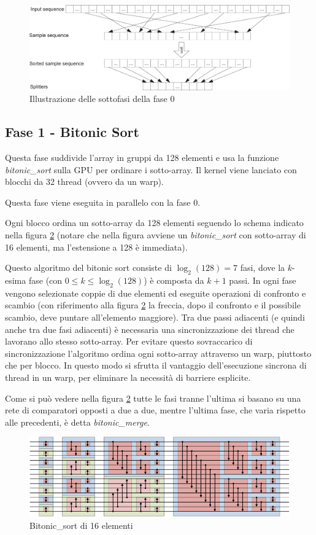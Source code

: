 \documentclass[a4paper, 11pt]{article}
\begin{document}
			\begin{figure}
				\centering
				\includegraphics[width=0.9\linewidth]{img/fase0}
				\caption{Illustrazione delle sottofasi della fase 0}
				\label{fig:fase0}
			\end{figure}
			
		\subsection{Fase 1 - Bitonic Sort}
			\label{fase1}
			Questa fase suddivide l'array in gruppi da 128 elementi e usa la funzione \emph{bitonic\_sort} sulla GPU per
			ordinare i sotto-array.
			Il kernel viene lanciato con blocchi da 32 thread (ovvero da un warp).
			
			Questa fase viene eseguita in parallelo con la fase 0.
			
			Ogni blocco ordina un sotto-array da 128 elementi seguendo lo schema indicato nella figura 
			\ref{fig:bitonicsort}
			(notare che nella figura avviene un \emph{bitonic\_sort} con sotto-array di 16 elementi, ma l'estensione a 128 è immediata).
			
			Questo algoritmo del bitonic sort consiste di $\log_2(128) = 7$ fasi, dove la $k$-esima fase (con $0 \leq k \leq \log_2(128)$) è 
			composta da $k+1$ passi.
			In ogni fase vengono selezionate coppie di due elementi ed eseguite operazioni di confronto e scambio (con riferimento alla figura
			\ref{fig:bitonicsort} la freccia, dopo il confronto e il possibile scambio, deve puntare all'elemento maggiore). 
			Tra due passi adiacenti (e quindi anche tra due fasi adiacenti) è necessaria una sincronizzazione dei thread che lavorano 
			allo stesso	sotto-array. 
			Per evitare questo sovraccarico di sincronizzazione l'algoritmo ordina ogni sotto-array attraverso un warp, piuttosto 
			che per blocco. In questo modo si sfrutta il vantaggio dell'esecuzione sincrona di thread in un warp, 
			per eliminare la necessità di barriere esplicite.
			
			Come si può vedere nella figura \ref{fig:bitonicsort} tutte le fasi tranne l'ultima si basano su una rete di comparatori opposti a due a due, 
			mentre l'ultima fase, che varia rispetto alle precedenti, è detta \emph{bitonic\_merge}.
			\begin{figure}
				\centering
				\includegraphics[width=0.9\linewidth]{img/BitonicSort}
				\caption{Bitonic\_sort di 16 elementi}
				\label{fig:bitonicsort}
			\end{figure}			
\end{document}
